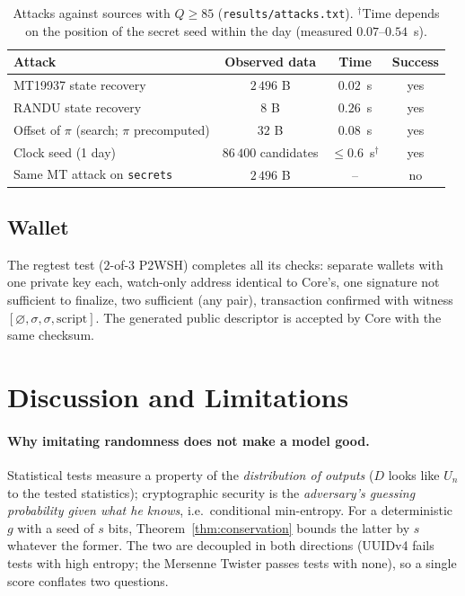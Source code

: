 \documentclass[11pt,a4paper]{article}
\theoremstyle{plain}
\theoremstyle{definition}
\begin{document}
\begin{table}[H]
\centering\small
\begin{tabular}{@{}lccc@{}}
\toprule
Attack & Observed data & Time & Success \\
\midrule
MT19937 state recovery & $2\,496$ B & $0.02$~s & yes \\
RANDU state recovery & $8$ B & $0.26$~s & yes \\
Offset of $\pi$ (search; $\pi$ precomputed) & $32$ B & $0.08$~s & yes \\
Clock seed (1 day) & $86\,400$ candidates & $\le0.6$~s$^{\dagger}$ & yes \\
Same MT attack on \texttt{secrets} & $2\,496$ B & -- & no \\
\bottomrule
\end{tabular}
\caption{Attacks against sources with $Q\ge85$ (\texttt{results/attacks.txt}).
$^{\dagger}$Time depends on the position of the secret seed within the day
(measured $0.07$--$0.54$~s).}
\end{table}

\subsection{Wallet}

The regtest test ($2$-of-$3$ P2WSH) completes all its checks: separate wallets
with one private key each, watch-only address identical to Core's, one
signature not sufficient to finalize, two sufficient (any pair), transaction
confirmed with witness $[\varnothing,\sigma,\sigma,\text{script}]$. The
generated public descriptor is accepted by Core with the same checksum.

\section{Discussion and Limitations}

\paragraph{Why imitating randomness does not make a model good.}
Statistical tests measure a property of the \emph{distribution of outputs}
($D$ looks like $U_n$ to the tested statistics); cryptographic security is the
\emph{adversary's guessing probability given what he knows}, i.e.\ conditional
min-entropy. For a deterministic $g$ with a seed of $s$ bits,
Theorem~\ref{thm:conservation} bounds the latter by $s$ whatever the former.
The two are decoupled in both directions (UUIDv4 fails tests with high entropy;
the Mersenne Twister passes tests with none), so a single score conflates two
questions.
\end{document}
